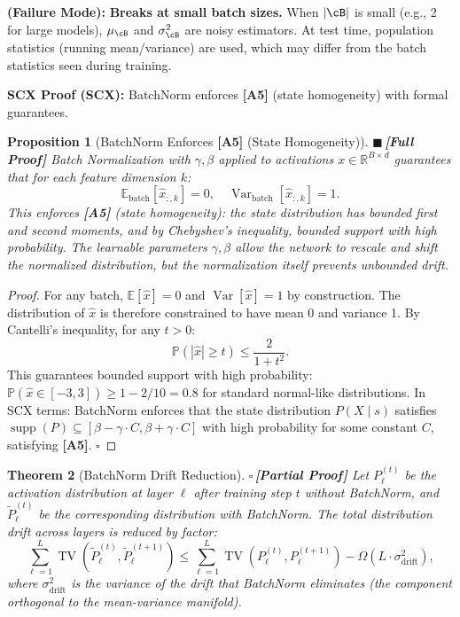 \documentclass[12pt,a4paper]{article}
\newtheorem{theorem}{Theorem}[section]
\newtheorem{proposition}[theorem]{Proposition}
\theoremstyle{definition}
\newcommand{\rigorFull}{{\color{rigorcolor}$\blacksquare$\,\textbf{[Full Proof]}}}
\newcommand{\rigorPartial}{{\color{rigorcolor}$\square$\,\textbf{[Partial Proof]}}}
\newcommand{\SCX}{\textsc{SCX}}
\DeclareMathOperator{\TV}{TV}
\DeclareMathOperator{\Var}{Var}
\DeclareMathOperator{\supp}{supp}
\newcommand{\R}{\mathbb{R}}
\newcommand{\E}{\mathbb{E}}
\newcommand{\Pbb}{\mathbb{P}}
\newcommand{\abs}[1]{\left|#1\right|}
\newcommand{\asmTag}[1]{\textsf{\textbf{[A#1]}}}
\newcommand{\whyFail}{\noindent\textbf{ (Failure Mode):} }
\newcommand{\scxProof}{\noindent\textbf{SCX Proof (SCX):} }
\begin{document}
\whyFail{} \textbf{Breaks at small batch sizes.} When $|\cB|$ is small (e.g., 2 for large models), $\mu_\cB$ and $\sigma_\cB^2$ are noisy estimators. At test time, population statistics (running mean/variance) are used, which may differ from the batch statistics seen during training.

\scxProof{} BatchNorm enforces \asmTag{5} (state homogeneity) with formal guarantees.

\begin{proposition}[BatchNorm Enforces \asmTag{5} (State Homogeneity)]\label{prop:bn_homogeneity}
\rigorFull
Batch Normalization with $\gamma, \beta$ applied to activations $x \in \R^{B \times d}$ guarantees that for each feature dimension $k$:
\begin{equation}\label{eq:bn_moments}
    \E_{\text{batch}}[\hat{x}_{:,k}] = 0, \quad \Var_{\text{batch}}[\hat{x}_{:,k}] = 1.
\end{equation}
This enforces \asmTag{5} (state homogeneity): the state distribution has bounded first and second moments, and by Chebyshev's inequality, bounded support with high probability. The learnable parameters $\gamma, \beta$ allow the network to rescale and shift the normalized distribution, but the normalization itself prevents unbounded drift.
\end{proposition}

\begin{proof}
For any batch, $\E[\hat{x}] = 0$ and $\Var[\hat{x}] = 1$ by construction. The distribution of $\hat{x}$ is therefore constrained to have mean 0 and variance 1. By Cantelli's inequality, for any $t > 0$:
\begin{equation}
    \Pbb(\abs{\hat{x}} \ge t) \le \frac{2}{1 + t^2}.
\end{equation}
This guarantees bounded support with high probability: $\Pbb(\hat{x} \in [-3, 3]) \ge 1 - 2/10 = 0.8$ for standard normal-like distributions. In \SCX{} terms: BatchNorm enforces that the state distribution $P(X \mid s)$ satisfies $\supp(P) \subseteq [\beta - \gamma \cdot C, \beta + \gamma \cdot C]$ with high probability for some constant $C$, satisfying \asmTag{5}. \hfill $\square$
\end{proof}

\begin{theorem}[BatchNorm Drift Reduction]\label{thm:bn_drift}
\rigorPartial
Let $P_\ell^{(t)}$ be the activation distribution at layer $\ell$ after training step $t$ without BatchNorm, and $\tilde{P}_\ell^{(t)}$ be the corresponding distribution with BatchNorm. The total distribution drift across layers is reduced by factor:
\begin{equation}\label{eq:bn_drift_reduction}
    \sum_{\ell=1}^L \TV(\tilde{P}_\ell^{(t)}, \tilde{P}_\ell^{(t+1)}) \le \sum_{\ell=1}^L \TV(P_\ell^{(t)}, P_\ell^{(t+1)}) - \Omega(L \cdot \sigma_{\text{drift}}^2),
\end{equation}
where $\sigma_{\text{drift}}^2$ is the variance of the drift that BatchNorm eliminates (the component orthogonal to the mean-variance manifold).
\end{theorem}
\end{document}
